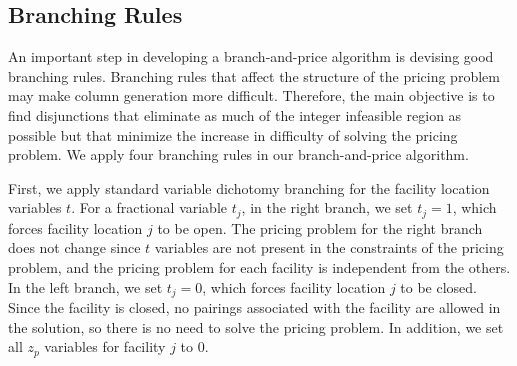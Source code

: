 \documentclass[11pt]{article}
\begin{document}
\subsection {Branching Rules}    
\label{sec:BranchingRules}
An important step in developing a branch-and-price algorithm is devising good branching rules.
Branching rules that affect the structure of the pricing problem may make column generation
 more difficult.  Therefore, the main 
objective is to find disjunctions that eliminate as much of the integer infeasible region 
as possible but that minimize the increase in difficulty of solving the pricing problem. We apply four 
branching rules in our branch-and-price algorithm. 

First, we apply standard variable dichotomy branching for the facility location variables $t$. 
For a fractional variable $t_j$, in the right branch, we set $t_j = 1$, which forces facility location 
$j$ to be open. The pricing problem for the right branch does not change since $t$ variables
are not present in the constraints of the pricing problem, and the pricing problem for each facility
is independent from the others.  In the left branch, we set   
$t_j = 0$, which forces facility location $j$ to be closed.  Since
the facility is closed, no pairings associated with the facility are allowed in the solution, so there
is no need to solve the pricing problem. In addition, we set all $z_{p}$ variables for facility $j$
to 0.
\end{document}
